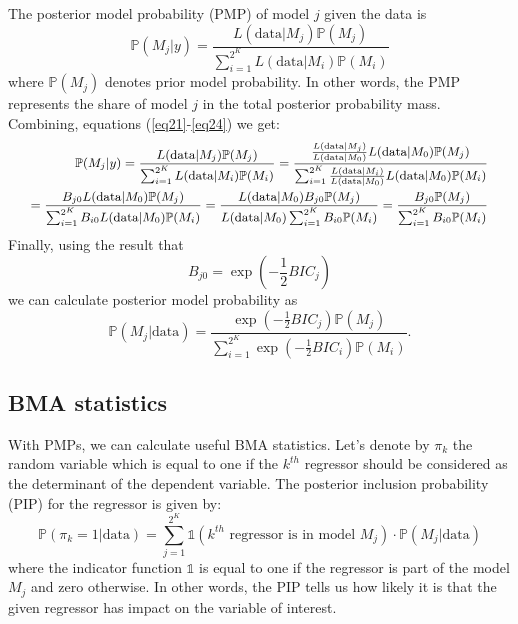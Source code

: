 \documentclass[a4paper]{article}
\begin{document}
The posterior model probability (PMP) of model $j$ given the data is
\begin{equation}\label{eq24}
    \mathbb{P}(M_{j}|y)=\frac{L(\text{data}|M_{j})\mathbb{P}(M_{j})}{\sum_{i=1}^{2^K}L(\text{data}|M_{i})\mathbb{P}(M_{i})}
\end{equation}
where $\mathbb{P}(M_{j})$ denotes prior model probability.
In other words, the PMP represents the share of model $j$ in the total posterior probability mass.
Combining, equations (\ref{eq21}-\ref{eq24}) we get:
\begin{equation}\label{eq25}
\fontsize{9pt}{12pt} \selectfont
\begin{split}
    \mathbb{P}(M_{j}|y)=\frac{L(\text{data}|M_{j})\mathbb{P}(M_{j})}{\sum_{i=1}^{2^K}L(\text{data}|M_{i})\mathbb{P}(M_{i})}
    =\frac{\frac{L(\text{data}|M_{j})}{L(\text{data}|M_{0})}
    L(\text{data}|M_{0})\mathbb{P}(M_{j})}{\sum_{i=1}^{2^K}\frac{L(\text{data}|M_{i})}{L(\text{data}|M_{0})}
    L(\text{data}|M_{0})\mathbb{P}(M_{i})}\\
    =\frac{B_{j0}L(\text{data}|M_{0})\mathbb{P}(M_{j})}{\sum_{i=1}^{2^K}B_{i0}
    L(\text{data}|M_{0})\mathbb{P}(M_{i})}
    =\frac{L(\text{data}|M_{0})B_{j0}\mathbb{P}(M_{j})}{L(\text{data}|M_{0})\sum_{i=1}^{2^K}B_{i0}\mathbb{P}(M_{i})}
    =\frac{B_{j0}\mathbb{P}(M_{j})}{\sum_{i=1}^{2^K}B_{i0}\mathbb{P}(M_{i})}
\end{split}
\end{equation}
\normalsize
Finally, using the result that
\begin{equation}\label{eq26}
 B_{j0}=\exp{(-\frac{1}{2}BIC_{j})}
\end{equation}
we can calculate posterior model probability as
\begin{equation}\label{eq27}
    \mathbb{P}(M_{j}|\text{data})=\frac{\exp{(-\frac{1}{2}BIC_{j})}\mathbb{P}(M_{j})}{\sum_{i=1}^{2^K}\exp{(-\frac{1}{2}BIC_{i})} \mathbb{P}(M_{i})}.
\end{equation}

\subsection{BMA statistics}
\noindent With PMPs, we can calculate useful BMA statistics.
Let's denote by $\pi_k$ the random variable which is equal to one if the $k^{th}$ regressor should be considered as the determinant of the dependent variable.
The posterior inclusion probability (PIP) for the regressor is given by:
\begin{equation}
\mathbb{P}(\pi_k = 1 |\text{data}) = \sum_{j=1}^{2^K} \mathds{1} (k^{th} \text{ regressor is in model } M_{j}) \cdot \mathbb{P}(M_{j}|\text{data})
\end{equation}
where the indicator function $\mathds{1}$ is equal to one if the regressor is part of the model $M_j$ and zero otherwise.
In other words, the PIP tells us how likely it is that the given regressor has impact on the variable of interest.
\end{document}
